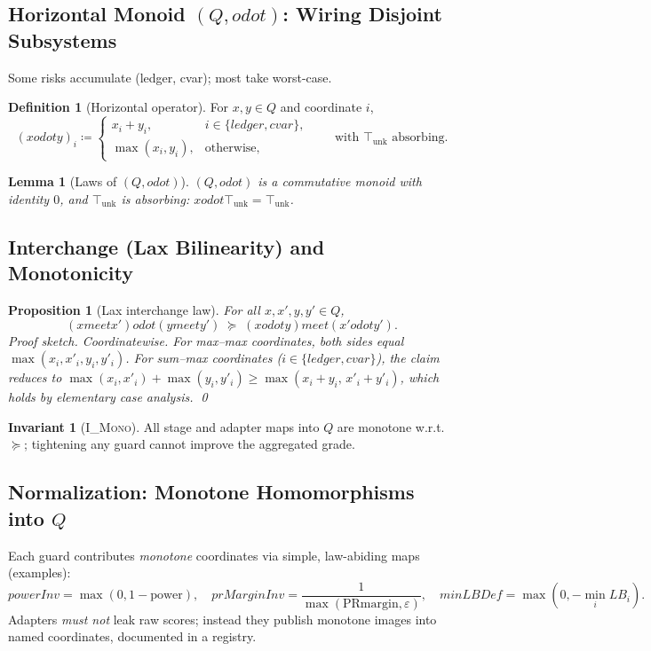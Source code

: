 \documentclass[11pt]{article}
\theoremstyle{plain}
\newtheorem{lemma}[theorem]{Lemma}
\newtheorem{proposition}[theorem]{Proposition}
\theoremstyle{definition}
\newtheorem{definition}[theorem]{Definition}
\newtheorem{invariant}[theorem]{Invariant}
\theoremstyle{remark}
\def\Q{Q}%
\def\vmeet{meet}%
\def\hplus{odot}%
\def\code#1{#1}%
\DeclareRobustCommand{\Q}{\texorpdfstring{\ensuremath{\mathcal{Q}}}{Q}}     %
\newcommand{\unk}{\top_{\mathrm{unk}}}         %
\newcommand{\vmeet}{\wedge}                    %
\newcommand{\hplus}{\odot}                     %
\newcommand{\geqQ}{\succeq}
\newcommand{\code}[1]{\texttt{\textup{#1}}}    %
\newcommand{\powerInv}{\code{powerInv}}
\newcommand{\prMarginInv}{\code{prMarginInv}}
\newcommand{\minLBDef}{\code{minLBDef}}
\newcommand{\ledger}{\code{ledger}}
\newcommand{\cvar}{\code{cvar}}
\newcommand{\IMono}{\textsc{I\_Mono}}
\def\Q{Q}%
\def\vmeet{meet}%
\def\hplus{odot}%
\def\code#1{#1}%
\begin{document}
\subsection{Horizontal Monoid $(\Q,\hplus)$: Wiring Disjoint Subsystems}
Some risks accumulate (\ledger, \cvar); most take worst-case.
\begin{definition}[Horizontal operator]
For $x,y\in\Q$ and coordinate $i$,
\[
  (x\hplus y)_i \coloneqq
  \begin{cases}
    x_i + y_i, & i\in\{\ledger,\cvar\},\\[0.2em]
    \max(x_i,y_i), & \text{otherwise},
  \end{cases}
  \qquad \text{with } \unk \text{ absorbing.}
\]
\end{definition}
\begin{lemma}[Laws of $(\Q,\hplus)$]\label{lem:hplus-laws}
$(\Q,\hplus)$ is a commutative monoid with identity $0$, and $\unk$ is absorbing: $x\hplus\unk=\unk$.
\end{lemma}

\subsection{Interchange (Lax Bilinearity) and Monotonicity}
\begin{proposition}[Lax interchange law]\label{prop:lax-interchange}
For all $x,x',y,y'\in\Q$,
\[
  (x\vmeet x') \hplus (y\vmeet y') \;\geqQ\; (x\hplus y)\vmeet(x'\hplus y').
\]
\emph{Proof sketch.} Coordinatewise. For max–max coordinates, both sides equal $\max(x_i,x'_i,y_i,y'_i)$. For sum–max coordinates ($i\in\{\ledger,\cvar\}$), the claim reduces to
$\max(x_i,x'_i) + \max(y_i,y'_i) \ge \max(x_i+y_i,\,x'_i+y'_i)$, which holds by elementary case analysis.
\qed
\end{proposition}

\begin{invariant}[\IMono]
All stage and adapter maps into $\Q$ are monotone w.r.t.\ $\geqQ$; tightening any guard cannot improve the aggregated grade.
\end{invariant}

\subsection{Normalization: Monotone Homomorphisms into \texorpdfstring{$\Q$}{Q}}
Each guard contributes \emph{monotone} coordinates via simple, law-abiding maps (examples):
\[
\powerInv=\max(0,1-\mathrm{power}),\quad
\prMarginInv=\frac{1}{\max(\mathrm{PRmargin},\varepsilon)},\quad
\minLBDef=\max(0,-\min_i LB_i).
\]
Adapters \emph{must not} leak raw scores; instead they publish monotone images into named coordinates, documented in a registry.
\end{document}
